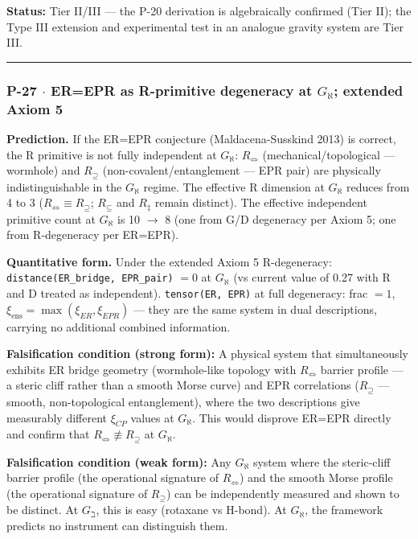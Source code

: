 \documentclass[12pt,a4paper]{article}
\begin{document}
\textbf{Status:} Tier II/III --- the P-20 derivation is algebraically confirmed (Tier II); the Type III extension and experimental test in an analogue gravity system are Tier III.

\begin{center}
\rule{0.5\textwidth}{0.4pt}
\end{center}

\subsubsection{P-27 $\cdot$ ER=EPR as R-primitive degeneracy at $G_{\aleph}$; extended Axiom 5}

\textbf{Prediction.} If the ER=EPR conjecture (Maldacena-Susskind 2013) is correct, the R primitive is not fully independent at $G_{\aleph}$: $R_{\Leftrightarrow}$ (mechanical/topological --- wormhole) and $R_{\supseteq}$ (non-covalent/entanglement --- EPR pair) are physically indistinguishable in the $G_{\aleph}$ regime. The effective R dimension at $G_{\aleph}$ reduces from 4 to 3 ($R_{\Leftrightarrow} \equiv R_{\supseteq}$; $R_{\subseteq}$ and $R_{\ddagger}$ remain distinct). The effective independent primitive count at $G_{\aleph}$ is 10 $\to$ 8 (one from G/D degeneracy per Axiom 5; one from R-degeneracy per ER=EPR).

\textbf{Quantitative form.} Under the extended Axiom 5 R-degeneracy: \texttt{distance(ER\_bridge, EPR\_pair)} $= 0$ at $G_{\aleph}$ (vs current value of 0.27 with R and D treated as independent). \texttt{tensor(ER, EPR)} at full degeneracy: frac $= 1$, $\xi_{\text{ens}} = \max(\xi_{ER}, \xi_{EPR})$ --- they are the same system in dual descriptions, carrying no additional combined information.

\textbf{Falsification condition (strong form):} A physical system that simultaneously exhibits ER bridge geometry (wormhole-like topology with $R_{\Leftrightarrow}$ barrier profile --- a steric cliff rather than a smooth Morse curve) and EPR correlations ($R_{\supseteq}$ --- smooth, non-topological entanglement), where the two descriptions give measurably different $\xi_{CP}$ values at $G_{\aleph}$. This would disprove ER=EPR directly and confirm that $R_{\Leftrightarrow} \not\equiv R_{\supseteq}$ at $G_{\aleph}$.

\textbf{Falsification condition (weak form):} Any $G_{\aleph}$ system where the steric-cliff barrier profile (the operational signature of $R_{\Leftrightarrow}$) and the smooth Morse profile (the operational signature of $R_{\supseteq}$) can be independently measured and shown to be distinct. At $G_{\beth}$, this is easy (rotaxane vs H-bond). At $G_{\aleph}$, the framework predicts no instrument can distinguish them.
\end{document}

